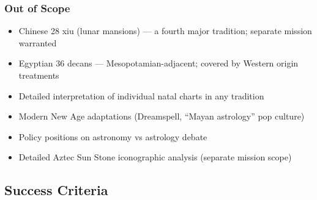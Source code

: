 \documentclass[11pt,letterpaper]{article}
\begin{document}
\subsubsection*{Out of Scope}
\begin{itemize}[leftmargin=1.5em]
  \item Chinese 28 xiu (lunar mansions) --- a fourth major tradition; separate mission warranted
  \item Egyptian 36 decans --- Mesopotamian-adjacent; covered by Western origin treatments
  \item Detailed interpretation of individual natal charts in any tradition
  \item Modern New Age adaptations (Dreamspell, ``Mayan astrology'' pop culture)
  \item Policy positions on astronomy vs astrology debate
  \item Detailed Aztec Sun Stone iconographic analysis (separate mission scope)
\end{itemize}

\subsection{Success Criteria}
\end{document}
